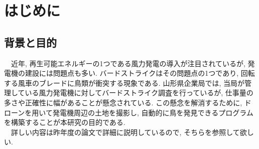 \documentclass[a4paper, 12pt]{report}
\begin{document}
\begin{abstract}
　近年, 再生可能エネルギーの1つである風力発電の導入が注目されているが, 発電機の建設には多くの問題点が存在する. その中でもバードストライクは重大な問題であり, 回転する風車のブレードに鳥類が衝突する現象である. 山形県企業局では, 当局が管理している風力発電機に対してバードストライク調査を行っているが, 仕事量の多さや調査の正確性に幅があることが懸念されている. 本研究の目的は, この懸念を解消するために, ドローンを用いて発電機周辺の土地を撮影し, 自動的に鳥を発見できるプログラムを構築することである. 
\\　昨年度, 山形大学の先輩である梅津魁秀さんは, 深層学習を用いたバードストライク調査プログラムの研究を行い, AEを使用してドローンで撮影した画像から物体画像を検出する手法を提案し, 物体画像に関してF2-scoreが0.83という高い精度で物体の有無を判定することができた. 
\\　今年度は課題であった, 汎用的なモデルを構築することと物体画像から鳥の画像を検出することに取り組んだ. 汎用的なモデルの構築には, モデルの自動アップデートを行い, 物体画像から鳥の画像を検出するためにCLIPの使用を提案した. 
\\　本研究の成果により, AE, PCA, K-meansクラスタリング, CLIPを組み合わせることで自動アップデートの手法を開発したが, アップデート後のF2-scoreが0.15と低く, 全ての物体の検出も出来ていないため汎用的なモデルを構築することは出来なかった. これは, アップデート元となるモデルが過剰にデータ拡張していたためと考えられる. 
\\　物体画像から鳥の画像の検出は, CLIPを用いて可能であることが確認できた. しかし, 手動でテストデータを構築したため, 厳密な評価を行うのは難しいがF2-scoreは0.33であった. 
\\　今後の課題として, 過剰なデータ拡張を行っていないモデルをアップデート元とすることと, 検出できた物体画像に対してCLIPを用いて鳥の検出の有無を評価することが挙げられる. 
\end{abstract}

\newpage

\tableofcontents


\newpage
\section{はじめに}

\subsection{背景と目的}

　近年, 再生可能エネルギーの1つである風力発電の導入が注目されているが, 発電機の建設には問題点も多い. バードストライクはその問題点の1つであり, 回転する風車のブレードに鳥類が衝突する現象である. 山形県企業局では, 当局が管理している風力発電機に対してバードストライク調査を行っているが, 仕事量の多さや正確性に幅があることが懸念されている. この懸念を解消するために, ドローンを用いて発電機周辺の土地を撮影し, 自動的に鳥を発見できるプログラムを構築することが本研究の目的である. 
\\　詳しい内容は昨年度の論文\cite{umetsu2023birdstrike}で詳細に説明しているので, そちらを参照して欲しい. 
\end{document}
